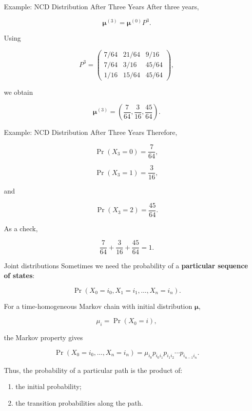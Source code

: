 \documentclass[
  ignorenonframetext,
  aspectratio=169,
]{beamer}
\providecommand{\tightlist}{%
  \setlength{\itemsep}{0pt}\setlength{\parskip}{0pt}}
\begin{document}
\begin{frame}{Example: NCD Distribution After Three Years}
\protect{}\label{example-ncd-distribution-after-three-years-1}
After three years,

\[
\boldsymbol{\mu}^{(3)}
=
\boldsymbol{\mu}^{(0)}P^3.
\]

Using

\[
P^3=
\begin{pmatrix}
7/64&21/64&9/16\\
7/64&3/16&45/64\\
1/16&15/64&45/64
\end{pmatrix},
\]

we obtain

\[
\boldsymbol{\mu}^{(3)}
=
\left(
\frac{7}{64},
\frac{3}{16},
\frac{45}{64}
\right).
\]
\end{frame}

\begin{frame}{Example: NCD Distribution After Three Years}
\protect{}\label{example-ncd-distribution-after-three-years-2}
Therefore,

\[
\Pr(X_3=0)=\frac{7}{64},
\]

\[
\Pr(X_3=1)=\frac{3}{16},
\]

and

\[
\Pr(X_3=2)=\frac{45}{64}.
\]

As a check,

\[
\frac{7}{64}
+\frac{3}{16}
+\frac{45}{64}
=1.
\]
\end{frame}

\begin{frame}{Joint distributions}
\protect{}\label{joint-distributions}
Sometimes we need the probability of a \textbf{particular sequence of
states}:

\[
\Pr(X_0=i_0,X_1=i_1,\ldots,X_n=i_n).
\]

For a time-homogeneous Markov chain with initial distribution
\(\boldsymbol{\mu}\),

\[
\mu_i=\Pr(X_0=i),
\]

the Markov property gives

\[
\boxed{
\Pr(X_0=i_0,\ldots,X_n=i_n)
=\mu_{i_0}
p_{i_0i_1}
p_{i_1i_2}
\cdots
p_{i_{n-1}i_n}.
}
\]

Thus, the probability of a particular path is the product of:

\begin{enumerate}
\tightlist
\item
  the initial probability;
\item
  the transition probabilities along the path.
\end{enumerate}
\end{frame}
\end{document}
